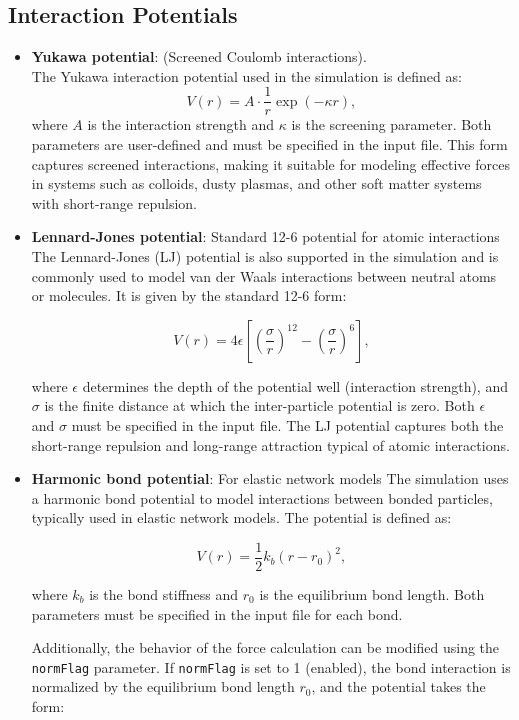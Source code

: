 \documentclass[a4paper,10pt]{article}
\begin{document}
\subsection*{Interaction Potentials}
\begin{itemize}
\item \textbf{Yukawa potential}: (Screened Coulomb interactions).\\
The Yukawa interaction potential used in the simulation is defined as:
\[
V(r) = A \cdot \frac{1}{r} \exp\left(-\kappa r\right),
\]
where \( A \) is the interaction strength and \( \kappa \) is the screening parameter. Both parameters are user-defined 
and must be specified in the input file. This form captures screened interactions, making it suitable for modeling 
effective forces in systems such as colloids, dusty plasmas, and other soft matter systems with short-range repulsion.
\item \textbf{Lennard-Jones potential}: Standard 12-6 potential for atomic interactions
The Lennard-Jones (LJ) potential is also supported in the simulation and is commonly used to model van der Waals 
interactions between neutral atoms or molecules. It is given by the standard 12-6 form:

\[
V(r) = 4\epsilon \left[ \left(\frac{\sigma}{r}\right)^{12} - \left(\frac{\sigma}{r}\right)^6 \right],
\]

where \( \epsilon \) determines the depth of the potential well (interaction strength), and \( \sigma \) is the finite 
distance at which the inter-particle potential is zero. Both \( \epsilon \) and \( \sigma \) must be specified in the 
input file. The LJ potential captures both the short-range repulsion and long-range attraction typical of atomic 
interactions.
\item \textbf{Harmonic bond potential}: For elastic network models
The simulation uses a harmonic bond potential to model interactions between bonded particles, typically used in elastic 
network models. The potential is defined as:

\[
V(r) = \frac{1}{2}k_b (r - r_0)^2,
\]

where \( k_b \) is the bond stiffness and \( r_0 \) is the equilibrium bond length. Both parameters must be specified in 
the input file for each bond.

Additionally, the behavior of the force calculation can be modified using the \texttt{normFlag} parameter. If 
\texttt{normFlag} is set to 1 (enabled), the bond interaction is normalized by the equilibrium bond length \( r_0 \), 
and the potential takes the form:


\end{itemize}
\end{document}
